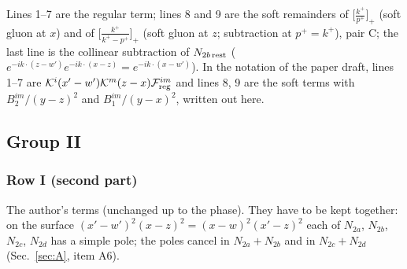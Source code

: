 Lines 1--7 are the regular term; lines 8 and 9 are the soft remainders of $\big[\frac{k^{+}}{p^{+}}\big]_{+}$ (soft gluon at $x$) and of $\big[\frac{k^{+}}{k^{+}-p^{+}}\big]_{+}$ (soft gluon at $z$; subtraction at $p^{+}=k^{+}$), pair C; the last line is the collinear subtraction of $N_{2b\,\rm rest}$ ($e^{-ik\cdot(z-w')}e^{-ik\cdot(x-z)}=e^{-ik\cdot(x-w')}$). In the notation of the paper draft, lines 1--7 are $\mathcal{K}^{i}(x'-w')\mathcal{K}^{m}(z-x)\mathcal{F}^{im}_{\rm reg}$ and lines 8, 9 are the soft terms with $B_{2}^{im}/(y-z)^{2}$ and $B_{1}^{im}/(y-x)^{2}$, written out here.
\subsection{Group II}
\subsubsection*{Row I (second part)}
The author's terms (unchanged up to the phase). They have to be kept together: on the surface $(x'-w')^{2}(x-z)^{2}=(x-w)^{2}(x'-z)^{2}$ each of $N_{2a}$, $N_{2b}$, $N_{2c}$, $N_{2d}$ has a simple pole; the poles cancel in $N_{2a}+N_{2b}$ and in $N_{2c}+N_{2d}$ (Sec.~\ref{sec:A}, item A6).
